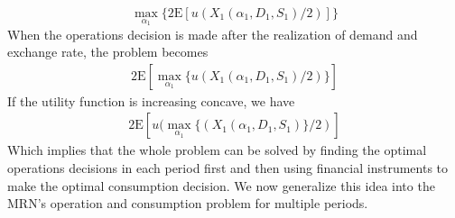 \documentclass{article}[12pt letter]
\newcommand{\E}{\mathrm{E}}
\begin{document}
\[ \max_{\alpha_1} \{2\E [u(X_1(\alpha_1,D_1,S_1)/2)]\} \]
When the operations decision is made after the realization of demand and exchange rate, the problem becomes
\begin{align*}
 2\E [\max_{\alpha_1} \{u(X_1(\alpha_1,D_1,S_1)/2)\}]
\end{align*}
If the utility function is increasing concave, we have
\begin{align*}
2\E [u(\max_{\alpha_1} \{(X_1(\alpha_1,D_1,S_1)\}/2)]
\end{align*}
Which implies that the whole problem can be solved by finding the optimal operations decisions in each period first and then using financial instruments to make the optimal consumption decision. 
We now generalize this idea into the MRN's operation and consumption problem for multiple periods.
\end{document}
